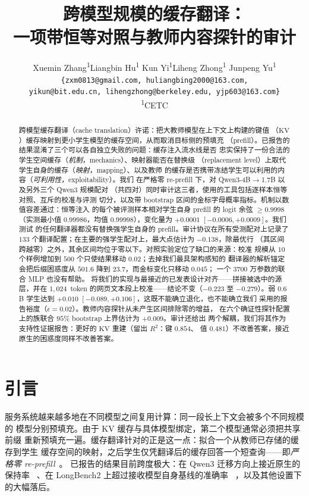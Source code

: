 \documentclass[10pt,a4paper,fontset=fandol]{ctexart}
\title{跨模型规模的缓存翻译：\\
一项带恒等对照与教师内容探针的审计}
\author{%
Xuemin Zhang\textsuperscript{1}\quad Liangbin Hu\textsuperscript{1}\quad
Kun Yi\textsuperscript{1}\quad Liheng Zhong\textsuperscript{1}\quad
Junpeng Yu\textsuperscript{1}\\[2pt]
\small\texttt{\{zxm0813@gmail.com, huliangbing2000@163.com,}\\
\small\texttt{yikun@bit.edu.cn, lihengzhong@berkeley.edu,
yjp603@163.com\}}\\[1pt]
\small\textsuperscript{1}CETC
}
\date{}
\newcommand{\kv}{\ensuremath{\mathrm{KV}}}
\begin{document}
\maketitle

\begin{abstract}
跨模型缓存翻译（cache translation）许诺：把大教师模型在上下文上构建的键值
（\kv{}）缓存映射到更小学生模型的缓存空间，从而取消目标侧的预填充
（prefill）。已报告的结果混淆了三个可以各自独立失败的问题：缓存注入流水线是否
忠实保持了一份合法的学生空间缓存（\emph{机制}，mechanics）、映射器能否在替换级
（replacement level）上取代学生自身的缓存（\emph{映射}，mapping）、以及教师
的缓存是否携带冻结学生可以利用的内容（\emph{可利用性}，exploitability）。我们
在严格零 re-prefill 下，对 Qwen3-4B$\to$1.7B 以及另外三个 Qwen3 规模配对
（共四对）同时审计这三者，使用的工具包括逐样本恒等对照、互斥的校准与评测
切分，以及带 bootstrap 区间的金标字母概率指标。机制以数值容差通过：恒等注入
的每个被评测样本相对学生自身 prefill 的 logit 余弦 $\ge 0.9998$（实测最小值
$0.99986$，均值 $0.99998$），变化量为 $+0.0001$ $[-0.0006,+0.0009]$。我们测试
的任何翻译器都没有替换强学生自身的 prefill。审计协议在所有受测配对上记录了
$133$ 个翻译配置；在主要的强学生配对上，最大点估计为 $-0.138$，除最优行
（其区间跨越零）之外，其余区间均位于零以下。对照实验定位了缺口的来源：校准
规模从 $10$ 个样例增加到 $500$ 个只使结果移动 $0.02$；去掉我们最具架构感知的
翻译器的解析锚定会把后缀困惑度从 $501.6$ 降到 $23.7$，而金标变化只移动 $0.045$；
一个 $3700$ 万参数的联合 MLP 也没有帮助。
将我们的实现与最接近的已发表设计对齐——拼接被选中的源层，并在
$1{,}024$~token 的网页文本段上校准——结论不变（$-0.223$ 至 $-0.279$）。弱
$0.6$B 学生达到 $+0.010$ $[-0.089,+0.106]$，这既不能确立退化，也不能确立我们
采用的报告裕度（$\epsilon{=}0.02$）。教师内容探针从未产生区间排除零的增益，
在六个确证性探针配置上的族联合 $95\%$ bootstrap 上界估计为 $+0.009$。审计还给出
两个解耦，我们将其作为支持性证据报告：更好的 \kv{} 重建（留出 $R^2$：键 $0.854$、
值 $0.481$）不改善答案，接近原生的困惑度同样不改善答案。
\end{abstract}

\section{引言}
\label{sec:intro}

服务系统越来越多地在不同模型之间复用计算：同一段长上下文会被多个不同规模的
模型分别预填充。由于 \kv{} 缓存与具体模型绑定，第二个模型通常必须把共享前缀
重新预填充一遍。缓存翻译针对的正是这一点：拟合一个从教师已存储的缓存到学生
缓存空间的映射，之后学生仅凭翻译后的缓存回答一个短查询——即\emph{严格零
re-prefill}~\citep{c2c2025,lsc2026,mot2026,heo2026,cachebridge2026,contextreuse2026}。
已报告的结果目前跨度极大：在 Qwen3 迁移方向上接近原生的保持率
~\citep{cachebridge2026}、在 LongBench2 上超过接收模型自身基线的准确率
~\citep{contextreuse2026}，以及其他设置下的大幅落后。
\end{document}

